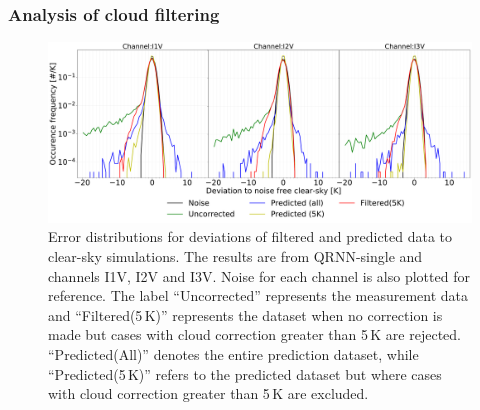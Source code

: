 \documentclass[amt, manuscript]{copernicus}
\begin{document}
\subsubsection{Analysis of cloud filtering}
%
\label{sec:cloud_filtering}
\begin{figure}[t ]
	\includegraphics[width=\textwidth]{Figures/error_distribution_QRNN-single.pdf} 
	\caption{Error distributions for deviations of filtered and predicted data to clear-sky simulations. The results are from QRNN-single and channels I1V, I2V and I3V. Noise for each channel is also plotted for reference. The label ``Uncorrected'' represents the measurement data and ``Filtered(5\,K)'' represents the dataset when no correction is made but cases with cloud correction greater than 5\,K are rejected. ``Predicted(All)'' denotes the entire prediction dataset, while ``Predicted(5\,K)'' refers to the predicted dataset but where cases with cloud correction greater than 5\,K are excluded.}
	\label{fig:error_distributions}	
\end{figure}
\end{document}
